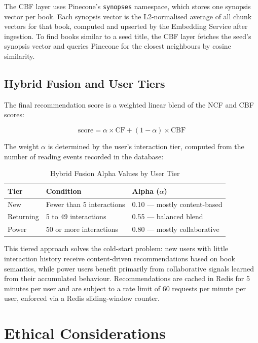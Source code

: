 The CBF layer uses Pinecone's \texttt{synopses} namespace, which stores one
synopsis vector per book. Each synopsis vector is the L2-normalised average of
all chunk vectors for that book, computed and upserted by the Embedding Service
after ingestion. To find books similar to a seed title, the CBF layer fetches
the seed's synopsis vector and queries Pinecone for the closest neighbours by
cosine similarity.

\subsection{Hybrid Fusion and User Tiers}

The final recommendation score is a weighted linear blend of the NCF and CBF
scores:

\begin{equation}
\text{score} = \alpha \times \text{CF} + (1 - \alpha) \times \text{CBF}
\end{equation}

The weight $\alpha$ is determined by the user's interaction tier, computed
from the number of reading events recorded in the database:

\begin{table}[H]
\centering
\caption{Hybrid Fusion Alpha Values by User Tier}
\label{tab:usertier}
\begin{tabularx}{\textwidth}{|l|l|X|}
\hline
\textbf{Tier} & \textbf{Condition} & \textbf{Alpha ($\alpha$)} \\
\hline
New       & Fewer than 5 interactions  & 0.10 --- mostly content-based \\
\hline
Returning & 5 to 49 interactions       & 0.55 --- balanced blend \\
\hline
Power     & 50 or more interactions    & 0.80 --- mostly collaborative \\
\hline
\end{tabularx}
\end{table}

This tiered approach solves the cold-start problem: new users with little
interaction history receive content-driven recommendations based on book
semantics, while power users benefit primarily from collaborative signals
learned from their accumulated behaviour. Recommendations are cached in Redis
for 5 minutes per user and are subject to a rate limit of 60 requests per
minute per user, enforced via a Redis sliding-window counter.

\section{Ethical Considerations}
\label{sec:ethics}

